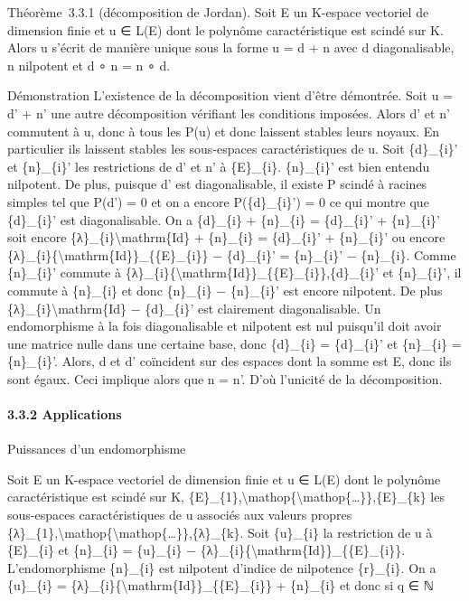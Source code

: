 \documentclass[]{article}
\begin{document}
Théorème~3.3.1 (décomposition de Jordan). Soit E un K-espace vectoriel
de dimension finie et u ∈ L(E) dont le polynôme caractéristique est
scindé sur K. Alors u s'écrit de manière unique sous la forme u = d + n
avec d diagonalisable, n nilpotent et d ∘ n = n ∘ d.

Démonstration L'existence de la décomposition vient d'être démontrée.
Soit u = d' + n' une autre décomposition vérifiant les conditions
imposées. Alors d' et n' commutent à u, donc à tous les P(u) et donc
laissent stables leurs noyaux. En particulier ils laissent stables les
sous-espaces caractéristiques de u. Soit \{d\}\_\{i\}' et \{n\}\_\{i\}'
les restrictions de d' et n' à \{E\}\_\{i\}. \{n\}\_\{i\}' est bien
entendu nilpotent. De plus, puisque d' est diagonalisable, il existe P
scindé à racines simples tel que P(d') = 0 et on a encore
P(\{d\}\_\{i\}') = 0 ce qui montre que \{d\}\_\{i\}' est diagonalisable.
On a \{d\}\_\{i\} + \{n\}\_\{i\} = \{d\}\_\{i\}' + \{n\}\_\{i\}' soit
encore \{λ\}\_\{i\}\textbackslash{}mathrm\{Id\} + \{n\}\_\{i\} =
\{d\}\_\{i\}' + \{n\}\_\{i\}' ou encore
\{λ\}\_\{i\}\{\textbackslash{}mathrm\{Id\}\}\_\{\{E\}\_\{i\}\} −
\{d\}\_\{i\}' = \{n\}\_\{i\}' − \{n\}\_\{i\}. Comme \{n\}\_\{i\}'
commute à
\{λ\}\_\{i\}\{\textbackslash{}mathrm\{Id\}\}\_\{\{E\}\_\{i\}\},\{d\}\_\{i\}'
et \{n\}\_\{i\}', il commute à \{n\}\_\{i\} et donc \{n\}\_\{i\} −
\{n\}\_\{i\}' est encore nilpotent. De plus
\{λ\}\_\{i\}\textbackslash{}mathrm\{Id\} − \{d\}\_\{i\}' est clairement
diagonalisable. Un endomorphisme à la fois diagonalisable et nilpotent
est nul puisqu'il doit avoir une matrice nulle dans une certaine base,
donc \{d\}\_\{i\} = \{d\}\_\{i\}' et \{n\}\_\{i\} = \{n\}\_\{i\}'.
Alors, d et d' coïncident sur des espaces dont la somme est E, donc ils
sont égaux. Ceci implique alors que n = n'. D'où l'unicité de la
décomposition.

\paragraph{3.3.2 Applications}

Puissances d'un endomorphisme

Soit E un K-espace vectoriel de dimension finie et u ∈ L(E) dont le
polynôme caractéristique est scindé sur K,
\{E\}\_\{1\},\textbackslash{}mathop\{\textbackslash{}mathop\{\ldots{}\}\},\{E\}\_\{k\}
les sous-espaces caractéristiques de u associés aux valeurs propres
\{λ\}\_\{1\},\textbackslash{}mathop\{\textbackslash{}mathop\{\ldots{}\}\},\{λ\}\_\{k\}.
Soit \{u\}\_\{i\} la restriction de u à \{E\}\_\{i\} et \{n\}\_\{i\} =
\{u\}\_\{i\} −
\{λ\}\_\{i\}\{\textbackslash{}mathrm\{Id\}\}\_\{\{E\}\_\{i\}\}.
L'endomorphisme \{n\}\_\{i\} est nilpotent d'indice de nilpotence
\{r\}\_\{i\}. On a \{u\}\_\{i\} =
\{λ\}\_\{i\}\{\textbackslash{}mathrm\{Id\}\}\_\{\{E\}\_\{i\}\} +
\{n\}\_\{i\} et donc si q ∈ ℕ
\end{document}
